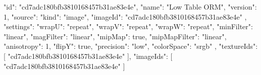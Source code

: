 {
  "id": "cd7adc180bfb3810168457b31ae83e4e",
  "name": "Low Table ORM",
  "version": 1,
  "source": {
    "kind": "image",
    "imageId": "cd7adc180bfb3810168457b31ae83e4e"
  },
  "settings": {
    "wrapU": "repeat",
    "wrapV": "repeat",
    "wrapW": "repeat",
    "minFilter": "linear",
    "magFilter": "linear",
    "mipMap": true,
    "mipMapFilter": "linear",
    "anisotropy": 1,
    "flipY": true,
    "precision": "low",
    "colorSpace": "srgb"
  },
  "textureIds": [
    "cd7adc180bfb3810168457b31ae83e4e"
  ],
  "imageIds": [
    "cd7adc180bfb3810168457b31ae83e4e"
  ]
}
